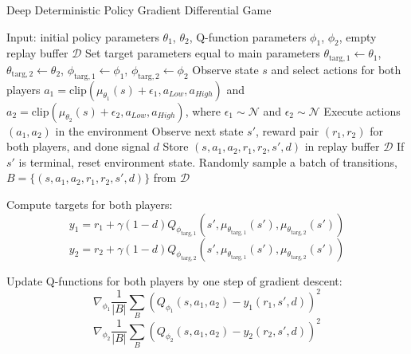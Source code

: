 \documentclass[conference]{IEEEtran}
\begin{document}
\begin{algorithm}[H]
    \caption{Deep Deterministic Policy Gradient Differential Game}
    \label{alg1}
\begin{algorithmic}[1]
    \STATE Input: initial policy parameters $\theta_1$, $\theta_2$, Q-function parameters $\phi_1$, $\phi_2$, empty replay buffer $\mathcal{D}$
    \STATE Set target parameters equal to main parameters $\theta_{\text{targ},1} \leftarrow \theta_1$, $\theta_{\text{targ},2} \leftarrow \theta_2$, $\phi_{\text{targ},1} \leftarrow \phi_1$, $\phi_{\text{targ},2} \leftarrow \phi_2$
    \REPEAT
        \STATE Observe state $s$ and select actions for both players $a_1 = \text{clip}(\mu_{\theta_1}(s) + \epsilon_1, a_{Low}, a_{High})$ and $a_2 = \text{clip}(\mu_{\theta_2}(s) + \epsilon_2, a_{Low}, a_{High})$, where $\epsilon_1 \sim \mathcal{N}$ and $\epsilon_2 \sim \mathcal{N}$
        \STATE Execute actions $(a_1, a_2)$ in the environment
        \STATE Observe next state $s'$, reward pair $(r_1, r_2)$ for both players, and done signal $d$
        \STATE Store $(s, a_1, a_2, r_1, r_2, s', d)$ in replay buffer $\mathcal{D}$
        \STATE If $s'$ is terminal, reset environment state.
                \STATE Randomly sample a batch of transitions, $B = \{ (s, a_1, a_2, r_1, r_2, s', d) \}$ from $\mathcal{D}$

                \STATE Compute targets for both players:
                \begin{equation*}
                    y_1 = r_1 + \gamma (1 - d) Q_{\phi_{\text{targ},1}}(s', \mu_{\theta_{\text{targ},1}}(s'), \mu_{\theta_{\text{targ},2}}(s'))
                \end{equation*}
                \begin{equation*}
                    y_2 = r_2 + \gamma (1 - d) Q_{\phi_{\text{targ},2}}(s', \mu_{\theta_{\text{targ},1}}(s'), \mu_{\theta_{\text{targ},2}}(s'))
                \end{equation*}

                \STATE Update Q-functions for both players by one step of gradient descent:
                \begin{equation*}
                    \nabla_{\phi_1} \frac{1}{|B|} \sum_{B} \left( Q_{\phi_1}(s, a_1, a_2) - y_1(r_1, s', d) \right)^2
                \end{equation*}
                \begin{equation*}
                    \nabla_{\phi_2} \frac{1}{|B|} \sum_{B} \left( Q_{\phi_2}(s, a_1, a_2) - y_2(r_2, s', d) \right)^2
                \end{equation*}


\end{algorithmic}
\end{algorithm}
\end{document}
